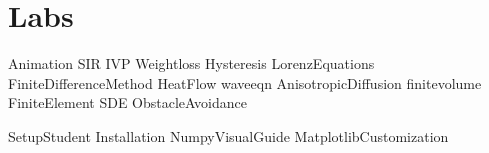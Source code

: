 \documentclass[opener-c,labs,green,nociteref]{HJnewsiambook}
\begin{document}
\part{Labs}
{Animation}
{SIR}
{IVP}
{Weightloss}
{Hysteresis}
{LorenzEquations}
{FiniteDifferenceMethod}
{HeatFlow}
{waveeqn}
{AnisotropicDiffusion}
{finitevolume}
{FiniteElement}
{SDE}
{ObstacleAvoidance}
%
%
%
\begin{appendices}
{SetupStudent}
{Installation}
{NumpyVisualGuide}
 {MatplotlibCustomization}
\end{appendices}



\end{document}
